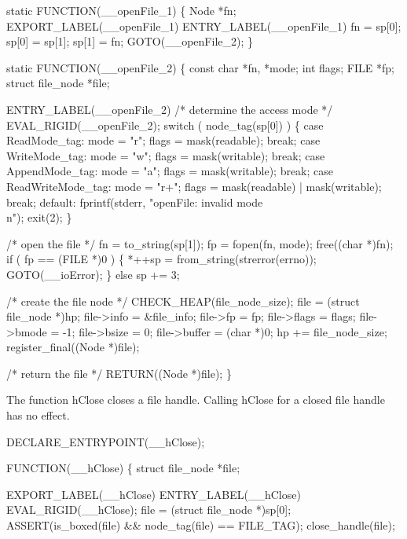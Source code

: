 static
FUNCTION(__openFile_1)
\{
    Node *fn;
    EXPORT_LABEL(__openFile_1)
 ENTRY_LABEL(__openFile_1)
    fn    = sp[0];
    sp[0] = sp[1];
    sp[1] = fn;
    GOTO(__openFile_2);
\}

static
FUNCTION(__openFile_2)
\{
    const char       *fn, *mode;
    int              flags;
    FILE             *fp;
    struct file_node *file;

 ENTRY_LABEL(__openFile_2)
    /* determine the access mode */
    EVAL_RIGID(__openFile_2);
    switch ( node_tag(sp[0]) )
    \{
    case ReadMode_tag:
        mode  = "r";
        flags = mask(readable);
        break;
    case WriteMode_tag:
        mode  = "w";
        flags = mask(writable);
        break;
    case AppendMode_tag:
        mode  = "a";
        flags = mask(writable);
        break;
    case ReadWriteMode_tag:
        mode  = "r+";
        flags = mask(readable) | mask(writable);
        break;
    default:
        fprintf(stderr, "openFile: invalid mode\\n");
        exit(2);
    \}

    /* open the file */
    fn = to_string(sp[1]);
    fp = fopen(fn, mode);
    free((char *)fn);
    if ( fp == (FILE *)0 )
    \{
        *++sp = from_string(strerror(errno));
        GOTO(__ioError);
    \}
    else
        sp += 3;

    /* create the file node */
    CHECK_HEAP(file_node_size);
    file         = (struct file_node *)hp;
    file->info   = &file_info;
    file->fp     = fp;
    file->flags  = flags;
    file->bmode  = -1;
    file->bsize  = 0;
    file->buffer = (char *)0;
    hp          += file_node_size;
    register_final((Node *)file);

    /* return the file */
    RETURN((Node *)file);
\}

\nwendcode{}\nwdocspar
The function {\Tt{}hClose\nwendquote} closes a file handle. Calling {\Tt{}hClose\nwendquote} for a
closed file handle has no effect.

\nwenddocs{}\plusendmoddef\nwstartdeflinemarkup{}\nwenddeflinemarkup
DECLARE_ENTRYPOINT(__hClose);

FUNCTION(__hClose)
\{
    struct file_node *file;

    EXPORT_LABEL(__hClose)
 ENTRY_LABEL(__hClose)
    EVAL_RIGID(__hClose);
    file = (struct file_node *)sp[0];
    ASSERT(is_boxed(file) && node_tag(file) == FILE_TAG);
    close_handle(file);

